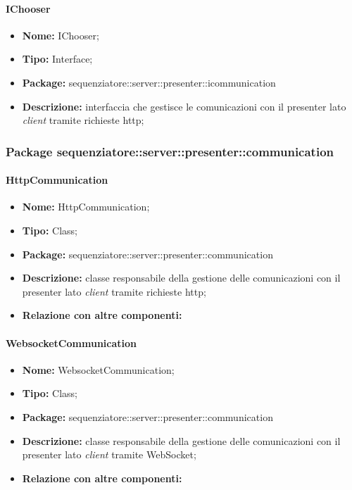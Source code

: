 \paragraph{IChooser}
	\begin{itemize}
		\item \textbf{Nome:} IChooser;
		\item \textbf{Tipo:} Interface;
		\item \textbf{Package:} sequenziatore::server::presenter::icommunication
		\item \textbf{Descrizione:} interfaccia che gestisce le comunicazioni con il presenter lato \textit{client} tramite richieste http;
	\end{itemize}
\subsubsection{Package sequenziatore::server::presenter::communication}
\paragraph{HttpCommunication}
	\begin{itemize}
		\item \textbf{Nome:} HttpCommunication;
		\item \textbf{Tipo:} Class;
		\item \textbf{Package:} sequenziatore::server::presenter::communication
		\item \textbf{Descrizione:} classe responsabile della gestione delle comunicazioni con il presenter lato \textit{client} tramite richieste http;
		\item \textbf{Relazione con altre componenti:}
	\end{itemize}
\paragraph{WebsocketCommunication}
	\begin{itemize}
		\item \textbf{Nome:} WebsocketCommunication;
		\item \textbf{Tipo:} Class;
		\item \textbf{Package:} sequenziatore::server::presenter::communication
		\item \textbf{Descrizione:} classe responsabile della gestione delle comunicazioni con il presenter lato \textit{client} tramite WebSocket;
		\item \textbf{Relazione con altre componenti:}
	\end{itemize}
